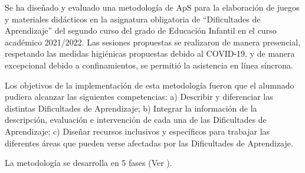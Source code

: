 \documentclass[spanish]{textolivre}
\begin{document}
Se ha diseñado y evaluado una metodología de ApS para la elaboración de juegos y materiales didácticos en la asignatura obligatoria de “Dificultades de Aprendizaje” del segundo curso del grado de Educación Infantil en el curso académico 2021/2022. Las sesiones propuestas se realizaron de manera presencial, respetando las medidas higiénicas propuestas debido al COVID-19, y de manera excepcional debido a confinamientos, se permitió la asistencia en línea síncrona.

Los objetivos de la implementación de esta metodología fueron que el alumnado pudiera alcanzar las siguientes competencias: a) Describir y diferenciar las distintas Dificultades de Aprendizaje; b) Integrar la información de la descripción, evaluación e intervención de cada una de las Dificultades de Aprendizaje; c) Diseñar recursos inclusivos y específicos para trabajar las diferentes áreas que pueden verse afectadas por las Dificultades de Aprendizaje.

La metodología se desarrolla en 5 fases (Ver ).
\end{document}
